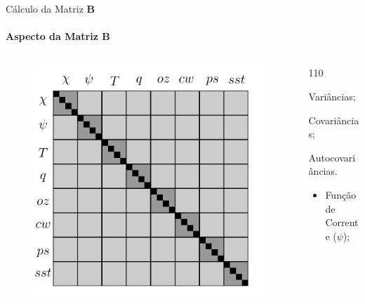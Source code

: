 \documentclass[10pt,aspectratio=169]{beamer}
\begin{document}
\begin{frame}[fragile]{Cálculo da Matriz $\mathbf{B}$}
\framesubtitle{Aspecto da Matriz $\mathbf{B}$}
  \vspace{-2em}
  \begin{columns}
    \begin{column}{0.5\textwidth}
      \begin{figure}[H]
        \centering
        \hspace*{2em}\includegraphics[scale=0.45]{figs/matriz_B-new.pdf}
        \vspace{-1.5em}
        \caption{}
      \end{figure}  
    \end{column}
    \begin{column}{0.5\textwidth} 
      \begin{dinglist}{110}
          \item Variâncias;
          \item Covariâncias;
          \item Autocovariâncias.
      \end{dinglist}
      \vspace{1em}
      \begin{itemize}
        \item Função de Corrente ($\psi$);     

\end{itemize}
\end{column}
\end{columns}
\end{frame}
\end{document}
